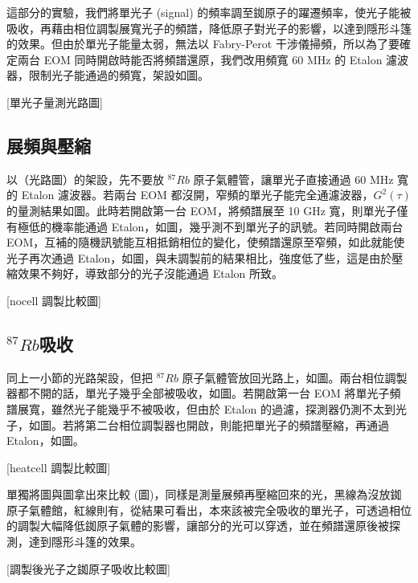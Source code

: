 \documentclass[class=NCU_thesis, crop=false]{standalone}
\begin{document}
這部分的實驗，我們將單光子 (signal) 的頻率調至銣原子的躍遷頻率，使光子能被吸收，再藉由相位調製展寬光子的頻譜，降低原子對光子的影響，以達到隱形斗篷的效果。但由於單光子能量太弱，無法以 Fabry-Perot 干涉儀掃頻，所以為了要確定兩台 EOM 同時開啟時能否將頻譜還原，我們改用頻寬 60 MHz 的 Etalon 濾波器，限制光子能通過的頻寬，架設如圖。

[單光子量測光路圖]

\subsection{展頻與壓縮}
以（光路圖）的架設，先不要放 $^{87}Rb$ 原子氣體管，讓單光子直接通過 60 MHz 寬的 Etalon 濾波器。若兩台 EOM 都沒開，窄頻的單光子能完全通濾波器，$G^{2}(\tau)$ 的量測結果如圖。此時若開啟第一台 EOM，將頻譜展至 10 GHz 寬，則單光子僅有極低的機率能通過 Etalon，如圖，幾乎測不到單光子的訊號。若同時開啟兩台 EOM，互補的隨機訊號能互相抵銷相位的變化，使頻譜還原至窄頻，如此就能使光子再次通過 Etalon，如圖，與未調製前的結果相比，強度低了些，這是由於壓縮效果不夠好，導致部分的光子沒能通過 Etalon 所致。

[nocell 調製比較圖]

\subsection{$^{87}Rb$吸收}
同上一小節的光路架設，但把 $^{87}Rb$ 原子氣體管放回光路上，如圖。兩台相位調製器都不開的話，單光子幾乎全部被吸收，如圖。若開啟第一台 EOM 將單光子頻譜展寬，雖然光子能幾乎不被吸收，但由於 Etalon 的過濾，探測器仍測不太到光子，如圖。若將第二台相位調製器也開啟，則能把單光子的頻譜壓縮，再通過 Etalon，如圖。

[heatcell 調製比較圖]

單獨將圖與圖拿出來比較 (圖)，同樣是測量展頻再壓縮回來的光，黑線為沒放銣原子氣體館，紅線則有，從結果可看出，本來該被完全吸收的單光子，可透過相位的調製大幅降低銣原子氣體的影響，讓部分的光可以穿透，並在頻譜還原後被探測，達到隱形斗篷的效果。

[調製後光子之銣原子吸收比較圖]
\end{document}
